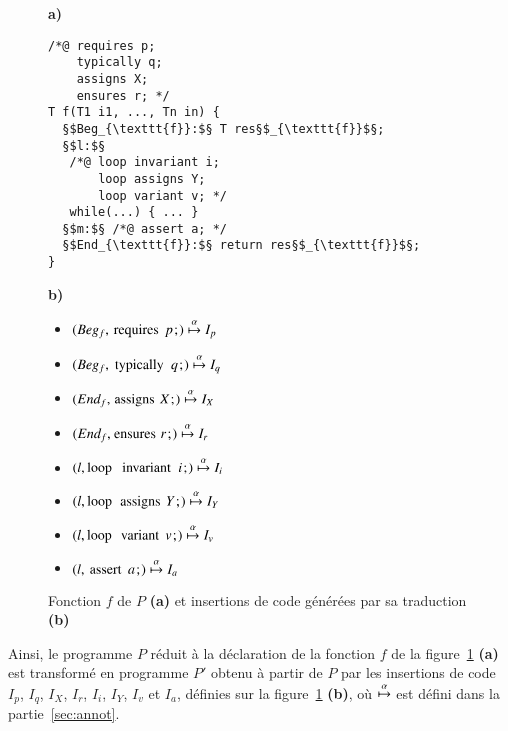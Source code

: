 \begin{figure}\centering
  \begin{minipage}{.4\columnwidth}\textbf{a)}
    \begin{lstlisting}[escapechar=§]
/*@ requires p;
    typically q;
    assigns X;
    ensures r; */
T f(T1 i1, ..., Tn in) {
  §$Beg_{\texttt{f}}:$§ T res§$_{\texttt{f}}$§;
  §$l:$§
   /*@ loop invariant i;
       loop assigns Y;
       loop variant v; */
   while(...) { ... }
  §$m:$§ /*@ assert a; */
  §$End_{\texttt{f}}:$§ return res§$_{\texttt{f}}$§;
}
    \end{lstlisting}
  \end{minipage}
  \begin{minipage}{.4\columnwidth}\textbf{b)}
    \begin{itemize}
    \item $(Beg_f, \mbox{\lstinline'requires'}~p\semicolon) \arule I_p$
    \item $(Beg_f, \mbox{\lstinline'typically'}~q\semicolon) \arule I_q$
    \item $(End_f, \mbox{\lstinline'assigns'}~X\semicolon) \arule I_X$
    \item $(End_f, \mbox{\lstinline'ensures'}~r\semicolon) \arule I_r$
    \item $(l, \mbox{\lstinline'loop invariant'}~i\semicolon) \arule I_i$
    \item $(l, \mbox{\lstinline'loop assigns'}~Y\semicolon) \arule I_Y$
    \item $(l, \mbox{\lstinline'loop variant'}~v\semicolon) \arule I_v$
    \item $(l, \mbox{\lstinline'assert'}~a\semicolon) \arule I_a$
    \end{itemize}
  \end{minipage}
  \caption{Fonction $f$ de $P$ \textbf{(a)} et insertions de code générées par
    sa traduction \textbf{(b)}\label{fig:P}}
\end{figure}

Ainsi, le programme $P$ réduit à la déclaration de la fonction $f$ de la
figure~\ref{fig:P} \textbf{(a)} est transformé en programme $P'$ obtenu à partir
de $P$ par les insertions de code $I_p$, $I_q$, $I_X$, $I_r$, $I_i$, $I_Y$,
$I_v$ et $I_a$, définies sur la figure~\ref{fig:P} \textbf{(b)}, où $\overset{\alpha}{\mapsto}$ est
défini dans la partie~\ref{sec:annot}.

